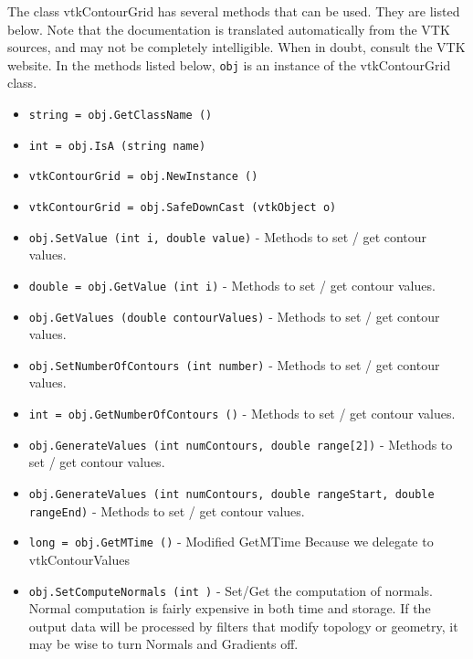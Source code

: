 The class vtkContourGrid has several methods that can be used.
  They are listed below.
Note that the documentation is translated automatically from the VTK sources,
and may not be completely intelligible.  When in doubt, consult the VTK website.
In the methods listed below, \verb|obj| is an instance of the vtkContourGrid class.
\begin{itemize}
\item  \verb|string = obj.GetClassName ()|

\item  \verb|int = obj.IsA (string name)|

\item  \verb|vtkContourGrid = obj.NewInstance ()|

\item  \verb|vtkContourGrid = obj.SafeDownCast (vtkObject o)|

\item  \verb|obj.SetValue (int i, double value)| -  Methods to set / get contour values.

\item  \verb|double = obj.GetValue (int i)| -  Methods to set / get contour values.

\item  \verb|obj.GetValues (double contourValues)| -  Methods to set / get contour values.

\item  \verb|obj.SetNumberOfContours (int number)| -  Methods to set / get contour values.

\item  \verb|int = obj.GetNumberOfContours ()| -  Methods to set / get contour values.

\item  \verb|obj.GenerateValues (int numContours, double range[2])| -  Methods to set / get contour values.

\item  \verb|obj.GenerateValues (int numContours, double rangeStart, double rangeEnd)| -  Methods to set / get contour values.

\item  \verb|long = obj.GetMTime ()| -  Modified GetMTime Because we delegate to vtkContourValues

\item  \verb|obj.SetComputeNormals (int )| -  Set/Get the computation of normals. Normal computation is fairly
 expensive in both time and storage. If the output data will be
 processed by filters that modify topology or geometry, it may be
 wise to turn Normals and Gradients off.


\end{itemize}
